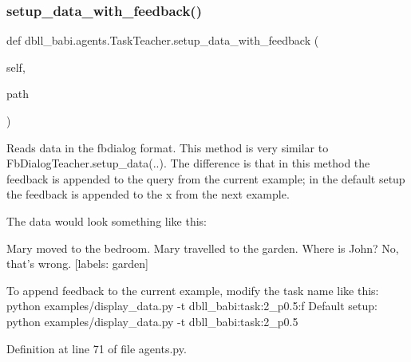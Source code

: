 \subsubsection{\texorpdfstring{setup\+\_\+data\+\_\+with\+\_\+feedback()}{setup\_data\_with\_feedback()}}
{\footnotesize\ttfamily def dbll\+\_\+babi.\+agents.\+Task\+Teacher.\+setup\+\_\+data\+\_\+with\+\_\+feedback (\begin{DoxyParamCaption}\item[{}]{self,  }\item[{}]{path }\end{DoxyParamCaption})}

\begin{DoxyVerb}Reads data in the fbdialog format. This method is very similar to
FbDialogTeacher.setup_data(..). The difference is that in this method the
feedback is appended to the query from the current example; in the default setup
the feedback is appended to the x from the next example.

The data would look something like this:

Mary moved to the bedroom.
Mary travelled to the garden.
Where is John?
No, that's wrong.
[labels: garden]

To append feedback to the current example, modify the task name like this:
  python examples/display_data.py -t dbll_babi:task:2_p0.5:f
Default setup:
  python examples/display_data.py -t dbll_babi:task:2_p0.5
\end{DoxyVerb}
 

Definition at line 71 of file agents.\+py.


